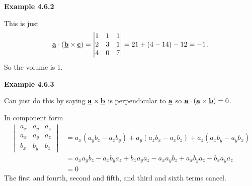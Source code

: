 \textbf{Example 4.6.2} \par

This is just 
\begin{align*}
\underline{\mathbf{a}} \cdot (\underline{\mathbf{b}}\times\underline{\mathbf{c}}) =  \begin{vmatrix}
    1 & 1 & 1\\
    2 & 3 & 1 \\
    4 & 0 & 7
\end{vmatrix} = 21 + (4-14) -12 = -1 \, .\\
\end{align*}
So the volume is 1.

\textbf{Example 4.6.3} \par

Can just do this by saying $\underline{\mathbf{a}}\times\underline{\mathbf{b}}$ is perpendicular to $\underline{\mathbf{a}}$ so $\underline{\mathbf{a}}\cdot(\underline{\mathbf{a}}\times\underline{\mathbf{b}}) = 0$.

In component form
\begin{align*}
\begin{vmatrix}
    a_x & a_y & a_z\\
    a_x & a_y & a_z \\
    b_x & b_y & b_z
\end{vmatrix} &= a_x(a_y b_z - a_z b_y) + a_y(a_z b_x - a_x b_z) + a_z (a_x b_y - a_y b_x) \\
&= a_x a_y b_z - a_x b_y a_z + b_x a_y a_z - a_x a_y b_z + a_x b_y a_z - b_x a_y a_z\\
&= 0
\end{align*}
The first and fourth, second and fifth, and third and sixth terms cancel.